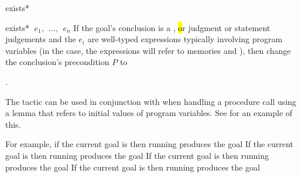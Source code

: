 \begin{tactic}{exists*}
  \begin{tsyntax}{exists* $\;e_1$, $\;\ldots$, $\;e_n$}
    If the goal's conclusion is a \prhl, \hl or \phl judgment or
    statement judgements and the $e_i$ are well-typed expressions
    typically involving program variables (in the \prhl case,
    the expressions will refer to memories  and ),
    then change the conclusion's precondition $P$ to
    \begin{center}
      .
    \end{center}

    The tactic can be used in conjunction with  when
    handling a procedure call using a lemma that refers to initial
    values of program variables. See  for an example
    of this.

    \medskip For example, if the current goal is
     then
    running 
    produces the goal
    If the current goal is
     then
    running 
    produces the goal
    If the current goal is
     then
    running 
    produces the goal
    If the current goal is
     then
    running 
    produces the goal
  \end{tsyntax}
\end{tactic}

